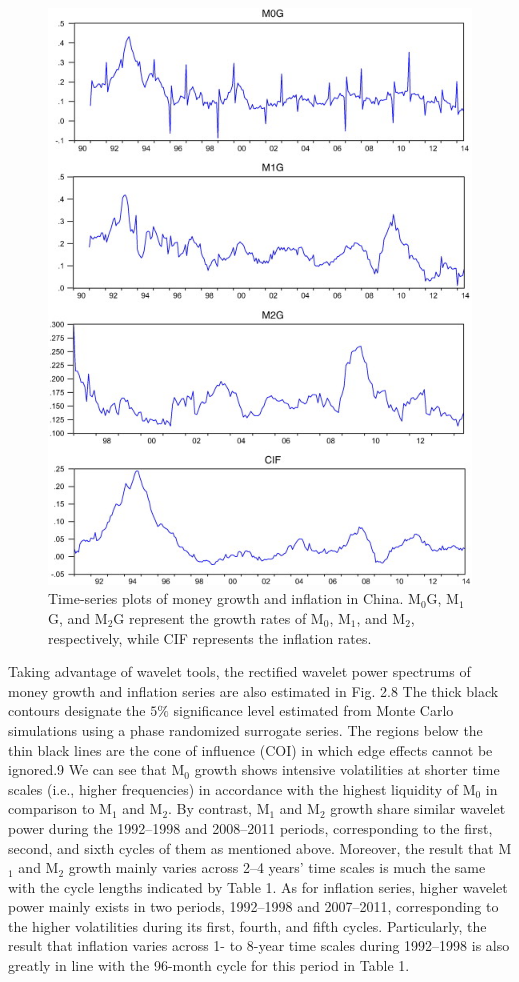\documentclass[a4paper,fleqn]{cas-sc}
\begin{document}
\begin{figure}[h]
    \centering
    \includegraphics[]{image/1.jpg}
    \caption{ Time-series plots of money growth and inflation in China. M$_0$G, M$_1$G, and M$_2$G represent the growth rates of M$_0$, M$_1$, and M$_2$, respectively, while CIF represents the inflation rates.}
\end{figure}

Taking advantage of wavelet tools, the rectified wavelet power spectrums of money growth and inflation series are also estimated in Fig. 2.8 The thick black contours designate the $5\%$ significance level estimated from Monte Carlo simulations using a phase randomized surrogate series. The regions below the thin black lines are the cone of influence (COI) in which edge effects cannot be ignored.9 We can see that M$_0$ growth shows intensive volatilities at shorter time scales (i.e., higher frequencies) in accordance with the highest liquidity of M$_0$ in comparison to M$_1$ and M$_2$. By contrast, M$_1$ and M$_2$ growth share similar wavelet power during the 1992–1998 and 2008–2011 periods, corresponding to the first, second, and sixth cycles of them as mentioned above. Moreover, the result that M$_1$ and M$_2$ growth mainly varies across 2–4 years' time scales is much the same with the cycle lengths indicated by Table 1. As for inflation series, higher wavelet power mainly exists in two periods, 1992–1998 and 2007–2011, corresponding to the higher volatilities during its first, fourth, and fifth cycles. Particularly, the result that inflation varies across 1- to 8-year time scales during 1992–1998 is also greatly in line with the 96-month cycle for this period in Table 1.
\end{document}
